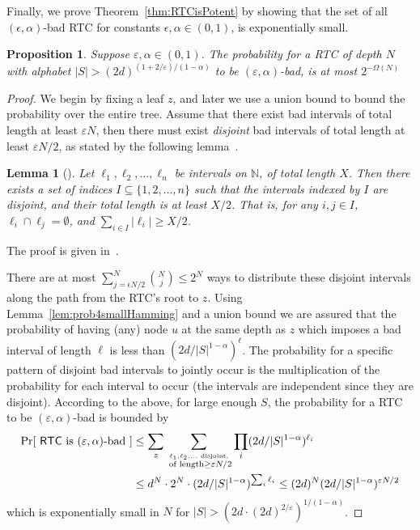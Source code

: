 \documentclass[ letterpaper, 11pt]{article}
\newtheorem{lemma}[theorem]{Lemma}
\newtheorem{proposition}[theorem]{Proposition}
\newcommand{\eps}{\varepsilon}
\newcommand{\RTBC}{\textsf{RTC}\xspace}
\begin{document}
Finally, we prove Theorem~\ref{thm:RTCisPotent} by showing that
the set of all $(\epsilon,\alpha)$-bad \RTBC
for constants $\epsilon,\alpha \in(0,1)$, is exponentially small.
\begin{proposition}\label{lem:probBadRTBC}
Suppose $\eps,\alpha \in (0,1)$.
The probability for a \RTBC of depth $N$
with alphabet $|S|>(2d)^{(1+2/\eps)/(1-\alpha)}$
to be $(\varepsilon,\alpha)$-bad,
is at most $2^{-\Omega(N)}$
\end{proposition}
\begin{proof}
We begin by fixing a leaf $z$, and later we use a union bound
to bound the probability over the entire tree.
Assume that there exist bad intervals of total length at least $\varepsilon N$,
then there must exist \emph{disjoint}
bad intervals of total length at least $\varepsilon N/2$,
as stated by the following lemma~\cite{schulman96}.


\begin{lemma}[\cite{schulman96}]\label{lem:intervals}
Let $\ell_1,\ell_2,\ldots,\ell_n$ be intervals on $\mathbb{N}$, of total length $X$.
Then there exists a set of indices $I\subseteq \{1, 2, \ldots, n\}$ such that
the intervals indexed by $I$ are disjoint, and their
total length is at least $X/2$. That is, for any $i,j\in I$, $\ell_i \cap \ell_j=\emptyset$, and
$
\sum_{i\in I}\lvert\ell_i\rvert \ge X/2
$.
\end{lemma}
\noindent The proof is given in~\cite{schulman96}.


There are at most $\sum_{j=\epsilon N/2}^N{N \choose j} \le 2^{N}$ ways to distribute these disjoint
intervals along the path from the \RTBC's root to $z$.
Using Lemma~\ref{lem:prob4smallHamming} and a union bound
we are assured that the probability of having
(any) node $u$ at the same depth as $z$ which imposes a bad interval of length $\ell$ is
 less than $(2d/|S|^{1-\alpha})^{\ell}$.
The probability for a specific pattern of disjoint bad intervals
to jointly occur is the multiplication of the probability for each interval to occur
(the intervals are independent since they are disjoint).
According to the above, for large enough $S$,
the probability for a \RTBC to be $(\varepsilon,\alpha)$-bad is bounded by
\begin{align*}
\Pr[\text{ \RTBC is $(\varepsilon,\alpha)$-bad }] &\le \sum_{z}
\sum_{\stackrel{\ell_1,\ell_2, \ldots \text{ disjoint,}}{\text{ of length} \ge \eps N/2}}
\prod_i (2d/|S|^{1-\alpha})^{\ell_i}  \\ &
\le d^N \cdot 2^N \cdot (2d/|S|^{1-\alpha})^{\sum_i \ell_i} \le (2d)^N (2d/|S|^{1-\alpha})^{\eps N/2}
\end{align*}
which is exponentially small in $N$ for $|S|> (2d\cdot(2d)^{2/\eps})^{1/(1-\alpha)}$.
\end{proof}
\end{document}
